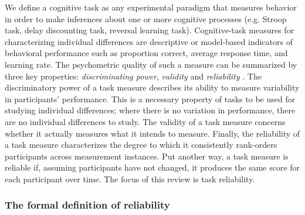 \documentclass[a4paper,12pt]{article}
\begin{document}
We define a cognitive task as any experimental paradigm that measures behavior in order to make inferences about one or more cognitive processes (e.g. Stroop task, delay discounting task, reversal learning task). Cognitive-task measures for characterizing individual differences are descriptive or model-based indicators of behavioral performance such as proportion correct, average response time, and learning rate. The psychometric quality of such a measure can be summarized by three key properties: \emph{discriminating power}, \emph{validity} and \emph{reliability} \cite{kline2015handbook}. The discriminatory power of a task measure describes its ability to measure variability in participants' performance. This is a necessary property of tasks to be used for studying individual differences; where there is no variation in performance, there are no individual differences to study. The validity of a task measure concerns whether it actually measures what it intends to measure. Finally, the reliability of a task measure characterizes the degree to which it consistently rank-orders participants across measurement instances. Put another way, a task measure is reliable if, assuming participants have not changed, it produces the same score for each participant over time. The focus of this review is task reliability. 
\subsubsection*{The formal definition of reliability}
\end{document}

